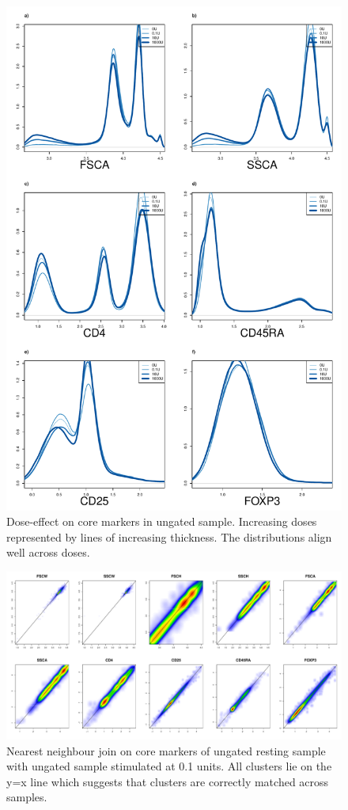 \begin{figure}[h]
\centering
\includegraphics[scale=.3]{IL2/figures/dose-effect.pdf}
{Dose-effect on core markers in ungated sample.}
{
Increasing doses represented by lines of increasing thickness.
The distributions align well across doses.
}
\end{figure}
\begin{figure}[h]
\centering
\includegraphics[scale=.3]{IL2/figures/ann-join-0U-01U.pdf}
{Nearest neighbour join on core markers of ungated resting sample with ungated sample stimulated at 0.1 units. }
{
All clusters lie on the y=x line which suggests that clusters are correctly matched across samples.
}
\end{figure} 
